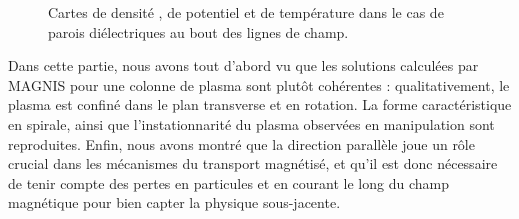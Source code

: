 \begin{refsection}
\begin{figure}[!htbp]
  \centering
    \caption{Cartes de densité , de
    potentiel  et de
    température  dans le cas de parois
    diélectriques au bout des lignes de champ.}
    \label{CybeleCartesIsolant}
\end{figure}		

Dans cette partie, nous avons tout d'abord vu que 
les solutions calculées par MAGNIS pour une colonne de plasma
sont plutôt cohérentes : qualitativement, le plasma est confiné dans le plan
transverse et en rotation. La forme caractéristique en spirale, ainsi que
l'instationnarité du plasma observées en manipulation sont reproduites. 
Enfin, nous avons montré que la direction parallèle joue un rôle crucial dans
les mécanismes du transport magnétisé, et qu'il est donc nécessaire de
tenir compte des pertes en particules et en courant le long du champ magnétique
pour bien capter la physique sous-jacente.


\end{refsection}
